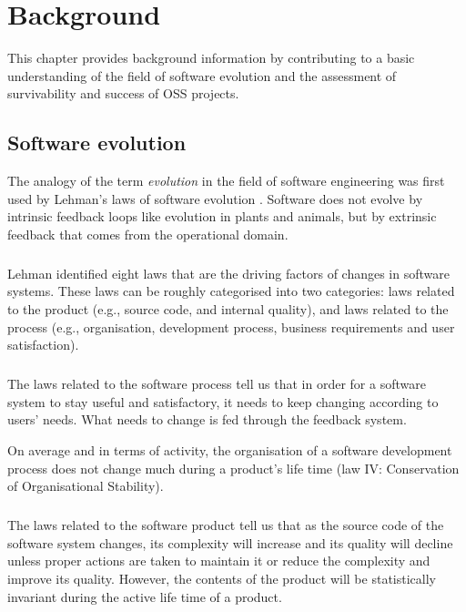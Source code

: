 \chapter{Background}
\label{background}

This chapter provides background information by contributing to a basic
understanding of the field of software evolution and the assessment of
survivability and success of OSS projects.

\section{Software evolution}
The analogy of the term \emph{evolution }\rm in the field of software
engineering was first used by Lehman's laws of software evolution \cite{lehman}.
Software does not evolve by intrinsic feedback loops like evolution in plants
and animals, but by extrinsic feedback that comes from the operational domain.

\paragraph{}
Lehman identified eight laws that are the driving factors of changes in software
systems. These laws can be roughly categorised into two categories: laws
related to the product (e.g., source code, and internal quality), and laws
related to the process (e.g., organisation, development process, business
requirements and user satisfaction).

\paragraph{}
The laws related to the software process tell us that in order for a software
system to stay useful and satisfactory, it needs to keep changing according to
users' needs. What needs to change is fed through the feedback system.

On average and in terms of activity, the organisation of a software development
process does not change much during a product's life time (law IV:
Conservation of Organisational Stability).

\paragraph{}
The laws related to the software product tell us that as the source code of the
software system changes, its complexity will increase and its quality will
decline unless proper actions are taken to maintain it or reduce the complexity
and improve its quality. However, the contents of the product will be
statistically invariant during the active life time of a product.

